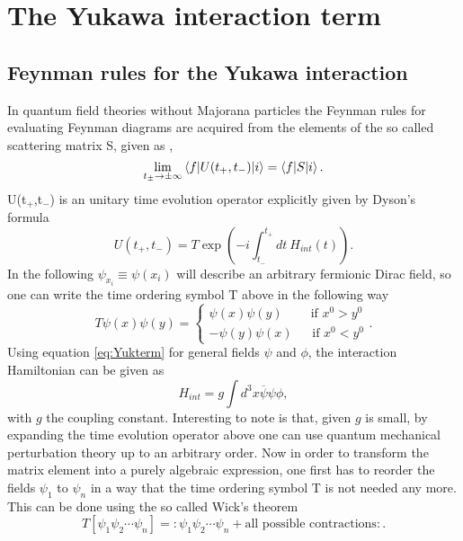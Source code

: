 \appendix
\chapter{The Yukawa interaction term} \label{ap:yuk}
\section{Feynman rules for the Yukawa interaction}
\label{ap:feynman}
In quantum field theories without Majorana particles the Feynman rules for evaluating Feynman diagrams are acquired from the elements of the so called scattering matrix S, given as \cite[Eq. 3.26]{Tong:2006},
\begin{equation}
\lim\limits_{t_\pm\rightarrow\pm\infty}\braket{f|U(t_+,t_-)|i}=\braket{f|S|i}.
\label{eq:s-matrix}
\end{equation}
U(t$_+$,t$_-$) is an unitary time evolution operator explicitly given by Dyson's formula
\begin{equation*}
	U(t_+,t_-)=T\exp\left(-i\int_{t_-}^{t_+}dt\:H_{int}(t)\right).
\end{equation*}
In the following $\psi_{x_i}\equiv\psi(x_i)$ will describe an arbitrary fermionic Dirac field, so one can write the time ordering symbol T above in the following way
\begin{equation*}
	T\psi(x)\psi(y)=\left\{\begin{array}{c}\psi(x)\psi(y)\:\:\:\:\:\:\:\:\:\:\text{if } x^0>y^0\\-\psi(y)\psi(x)\:\:\:\:\:\:\:\text{if }x^0<y^0\end{array}\right. .
	\end{equation*}
Using equation \eqref{eq:Yukterm} for general fields $\psi$ and $\phi$, the interaction Hamiltonian can be given as
\begin{equation*}
	H_{int}=g\int d^3x \overline{\psi}\psi\phi,
\end{equation*}
with $g$ the coupling constant.\newline\indent
Interesting to note is that, given $g$ is small, by expanding the time evolution operator above one can use quantum mechanical perturbation theory up to an arbitrary order. \newline\indent
Now in order to transform the matrix element into a purely algebraic expression, one first has to reorder the fields $\psi_1$ to $\psi_n$ in a way that the time ordering symbol T is not needed any more. This can be done using the so called Wick's theorem
\begin{equation*}
	T\left[\psi_1\psi_2\cdots\psi_n\right]=:\psi_1\psi_2\cdots\psi_n+\text{all possible contractions}:.
\end{equation*}
